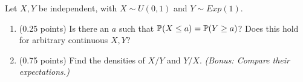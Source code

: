 \documentclass[a4paper]{report}
\begin{document}
\begin{problem}
Let $X,Y$ be independent, with $X\sim U(0,1)$ and $Y\sim Exp(1)$.
\begin{enumerate}
    \item (0.25 points) Is there an $a$ such that $\P(X\leq a)=\P(Y\geq a)$? Does this hold
    for arbitrary continuous $X,Y$?
    \item (0.75 points) Find the densities of $X/Y$ and $Y/X$. \textit{(Bonus: Compare their expectations.)}
\end{enumerate}

\end{problem}
\end{document}
